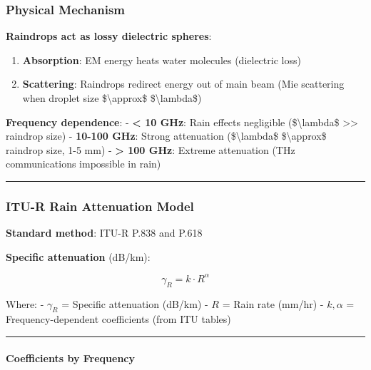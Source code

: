\subsubsection{Physical Mechanism}\label{physical-mechanism}

\textbf{Raindrops act as lossy dielectric spheres}:

\begin{enumerate}
\def\labelenumi{\arabic{enumi}.}
\tightlist
\item
  \textbf{Absorption}: EM energy heats water molecules (dielectric loss)
\item
  \textbf{Scattering}: Raindrops redirect energy out of main beam (Mie
  scattering when droplet size \$\textbackslash approx\$
  \$\textbackslash lambda\$)
\end{enumerate}

\textbf{Frequency dependence}: - \textbf{\textless{} 10 GHz}: Rain
effects negligible (\$\textbackslash lambda\$ \textgreater\textgreater{}
raindrop size) - \textbf{10-100 GHz}: Strong attenuation
(\$\textbackslash lambda\$ \$\textbackslash approx\$ raindrop size, 1-5
mm) - \textbf{\textgreater{} 100 GHz}: Extreme attenuation (THz
communications impossible in rain)

\begin{center}\rule{0.5\linewidth}{0.5pt}\end{center}

\subsubsection{ITU-R Rain Attenuation
Model}\label{itu-r-rain-attenuation-model}

\textbf{Standard method}: ITU-R P.838 and P.618

\textbf{Specific attenuation} (dB/km):

\[
\gamma_R = k \cdot R^\alpha
\]

Where: - \(\gamma_R\) = Specific attenuation (dB/km) - \(R\) = Rain rate
(mm/hr) - \(k, \alpha\) = Frequency-dependent coefficients (from ITU
tables)

\begin{center}\rule{0.5\linewidth}{0.5pt}\end{center}

\paragraph{Coefficients by Frequency}\label{coefficients-by-frequency}

